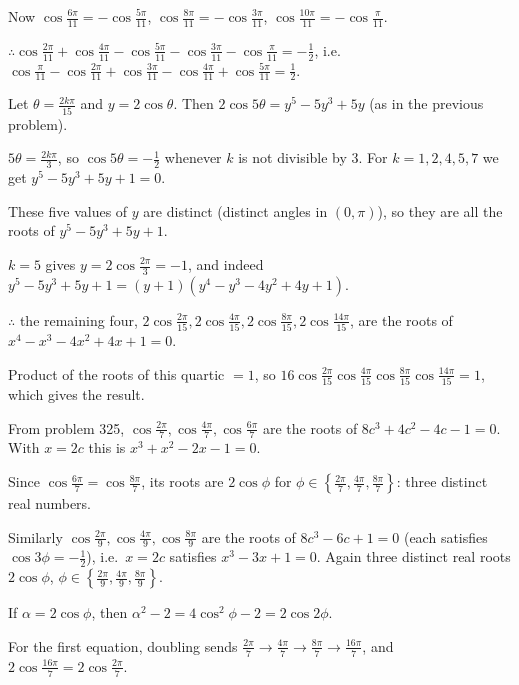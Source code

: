   Now $\cos\frac{6\pi}{11} = -\cos\frac{5\pi}{11}$, $\cos\frac{8\pi}{11} = -\cos\frac{3\pi}{11}$,
  $\cos\frac{10\pi}{11} = -\cos\frac{\pi}{11}$.

  $\therefore \cos\frac{2\pi}{11} + \cos\frac{4\pi}{11} - \cos\frac{5\pi}{11} - \cos\frac{3\pi}{11}
  - \cos\frac{\pi}{11} = -\frac{1}{2}$, i.e.\ $\cos\frac{\pi}{11} - \cos\frac{2\pi}{11} + \cos\frac{3\pi}{11} -
  \cos\frac{4\pi}{11} + \cos\frac{5\pi}{11} = \frac{1}{2}$.
\item Let $\theta = \frac{2k\pi}{15}$ and $y = 2\cos\theta$. Then $2\cos5\theta = y^5 - 5y^3 + 5y$ (as in the
  previous problem).

  $5\theta = \frac{2k\pi}{3}$, so $\cos5\theta = -\frac{1}{2}$ whenever $k$ is not divisible by $3$. For $k = 1, 2, 4, 5, 7$ we
  get $y^5 - 5y^3 + 5y + 1 = 0$.

  These five values of $y$ are distinct (distinct angles in $(0, \pi)$), so they are all the roots of $y^5 - 5y^3
  + 5y + 1$.

  $k = 5$ gives $y = 2\cos\frac{2\pi}{3} = -1$, and indeed $y^5 - 5y^3 + 5y + 1 = (y + 1)(y^4 - y^3 - 4y^2 + 4y
  + 1)$.

  $\therefore$ the remaining four, $2\cos\frac{2\pi}{15}, 2\cos\frac{4\pi}{15}, 2\cos\frac{8\pi}{15},
  2\cos\frac{14\pi}{15}$, are the roots of $x^4 - x^3 - 4x^2 + 4x + 1 = 0$.

  Product of the roots of this quartic $= 1$, so $16\cos\frac{2\pi}{15}\cos\frac{4\pi}{15}\cos\frac{8\pi}{15}
  \cos\frac{14\pi}{15} = 1$, which gives the result.
\item From problem 325, $\cos\frac{2\pi}{7}, \cos\frac{4\pi}{7}, \cos\frac{6\pi}{7}$ are the roots of $8c^3 +
  4c^2 - 4c - 1 = 0$. With $x = 2c$ this is $x^3 + x^2 - 2x - 1 = 0$.

  Since $\cos\frac{6\pi}{7} = \cos\frac{8\pi}{7}$, its roots are $2\cos\phi$ for $\phi\in\left\{\frac{2\pi}{7},
  \frac{4\pi}{7}, \frac{8\pi}{7}\right\}$: three distinct real numbers.

  Similarly $\cos\frac{2\pi}{9}, \cos\frac{4\pi}{9}, \cos\frac{8\pi}{9}$ are the roots of $8c^3 - 6c + 1 = 0$
  (each satisfies $\cos3\phi = -\frac{1}{2}$), i.e.\ $x = 2c$ satisfies $x^3 - 3x + 1 = 0$. Again three distinct
  real roots $2\cos\phi$, $\phi\in\left\{\frac{2\pi}{9}, \frac{4\pi}{9}, \frac{8\pi}{9}\right\}$.

  If $\alpha = 2\cos\phi$, then $\alpha^2 - 2 = 4\cos^2\phi - 2 = 2\cos2\phi$.

  For the first equation, doubling sends $\frac{2\pi}{7}\rightarrow\frac{4\pi}{7}\rightarrow\frac{8\pi}{7}
  \rightarrow\frac{16\pi}{7}$, and $2\cos\frac{16\pi}{7} = 2\cos\frac{2\pi}{7}$.

